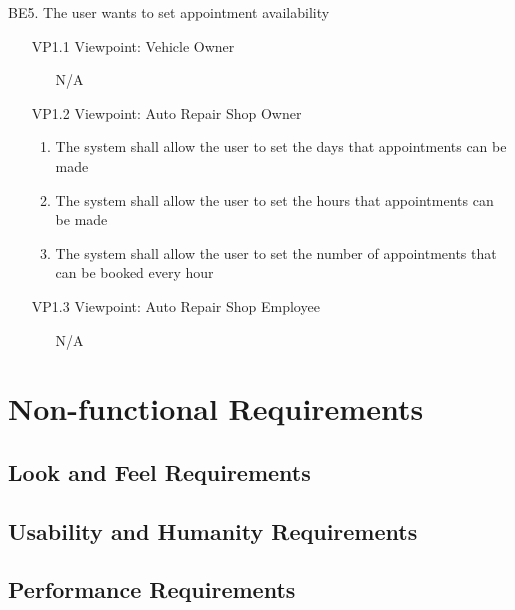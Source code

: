 \documentclass[12pt]{article}
\begin{document}
\item [{BE}5.] The user wants to set appointment availability
\begin{enumerate}
	\item [{VP1}.1] Viewpoint: Vehicle Owner
	      \begin{enumerate}
		      \item[] N/A
	      \end{enumerate}
\end{enumerate}
\begin{enumerate}
	\item [{VP1}.2] Viewpoint: Auto Repair Shop Owner
	      \begin{enumerate}
		      \item The system shall allow the user to set the days that appointments can be made
		      \item The system shall allow the user to set the hours that appointments can be made
		      \item The system shall allow the user to set the number of appointments that can be booked every hour
	      \end{enumerate}
\end{enumerate}
\begin{enumerate}
	\item [{VP1}.3] Viewpoint: Auto Repair Shop Employee
	      \begin{enumerate}
		      \item[] N/A
	      \end{enumerate}
\end{enumerate}

\section{Non-functional Requirements}

\subsection{Look and Feel Requirements}

\subsection{Usability and Humanity Requirements}

\subsection{Performance Requirements}
\end{document}
